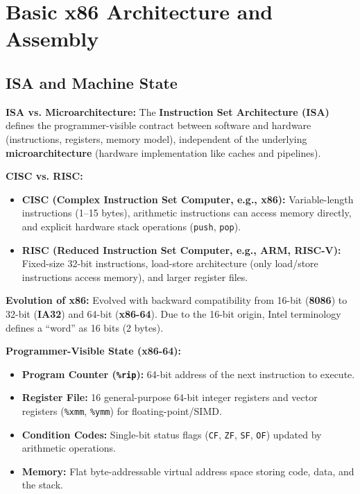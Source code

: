 \section{Basic x86 Architecture and Assembly}

\subsection{ISA and Machine State}

\begin{definition}
    \textbf{ISA vs. Microarchitecture:} The \textbf{Instruction Set Architecture (ISA)} defines the programmer-visible contract between software and hardware (instructions, registers, memory model), independent of the underlying \textbf{microarchitecture} (hardware implementation like caches and pipelines).
\end{definition}

\begin{definition}
    \textbf{CISC vs. RISC:}
    \begin{itemize}
        \item \textbf{CISC (Complex Instruction Set Computer, e.g., x86):} Variable-length instructions (1--15 bytes), arithmetic instructions can access memory directly, and explicit hardware stack operations (\texttt{push}, \texttt{pop}).
        \item \textbf{RISC (Reduced Instruction Set Computer, e.g., ARM, RISC-V):} Fixed-size 32-bit instructions, load-store architecture (only load/store instructions access memory), and larger register files.
    \end{itemize}
\end{definition}

\begin{remark}
    \textbf{Evolution of x86:} Evolved with backward compatibility from 16-bit (\textbf{8086}) to 32-bit (\textbf{IA32}) and 64-bit (\textbf{x86-64}). Due to the 16-bit origin, Intel terminology defines a ``word'' as 16 bits (2 bytes).
\end{remark}

\begin{definition}
    \textbf{Programmer-Visible State (x86-64):}
    \begin{itemize}
        \item \textbf{Program Counter (\texttt{\%rip}):} 64-bit address of the next instruction to execute.
        \item \textbf{Register File:} 16 general-purpose 64-bit integer registers and vector registers (\texttt{\%xmm}, \texttt{\%ymm}) for floating-point/SIMD.
        \item \textbf{Condition Codes:} Single-bit status flags (\texttt{CF}, \texttt{ZF}, \texttt{SF}, \texttt{OF}) updated by arithmetic operations.
        \item \textbf{Memory:} Flat byte-addressable virtual address space storing code, data, and the stack.
    \end{itemize}
\end{definition}

